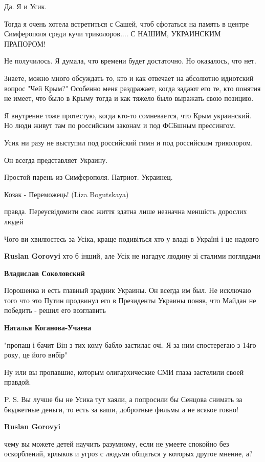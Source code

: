 \begin{itemize}
\begin{itemize}
Да. Я и Усик.

Тогда я очень хотела встретиться с Сашей, чтоб сфотаться на память в центре
Симферополя среди кучи триколоров.... С НАШИМ, УКРАИНСКИМ ПРАПОРОМ!

Не получилось. Я думала, что времени будет достаточно. Но оказалось, что нет.

Знаете, можно много обсуждать то, кто и как отвечает на абсолютно идиотский
вопрос "Чей Крым?" Особенно меня раздражает, когда задают его те, кто понятия
не имеет, что было в Крыму тогда и как тяжело было выражать свою позицию.

Я внутренне тоже протестую, когда кто-то сомневается, что Крым украинский. Но
люди живут там по российским законам и под ФСБшным прессингом.

Усик ни разу не выступил под российский гимн и под российским триколором.

Он всегда представляет Украину.

Простой парень из Симферополя. Патриот. Украинец.

Козак - Переможець! (Liza Bogutskaya)

правда. Переусвідомити своє життя здатна лише незначна меншість дорослих людей

Чого ви хвилюєтесь за Усіка, краще подивіться хто у владі в Україні і це надовго

\textbf{Ruslan Gorovyi} хто б інший, але Усік не нагадує людину зі сталими поглядами

\textbf{Владислав Соколовский} 

Порошенка и есть главный зрадник Украины. Он всегда им был. Не исключаю того
что это Путин продвинул его в Президенты Украины поняв, что Майдан не победить
- решил его возглавить

\textbf{Наталья Коганова-Учаева} 

"пропащ і бачит Він з тих кому бабло застилає очі. Я за ним спостерегаю з 14го
року, це його вибір"

Ну или вы пропавшие, которым олигархические СМИ глаза застелили своей правдой.

P. S. Вы лучше бы не Усика тут хаяли, а попросили бы Сенцова снимать за
бюджетные деньги, то есть за ваши, добротные фильмы а не всякое говно!


\textbf{Ruslan Gorovyi} 

чему вы можете детей научить разумному, если не умеете спокойно без
оскорблений, ярлыков и угроз с людьми общаться у которых другое мнение, а?


\end{itemize}
\end{itemize}
